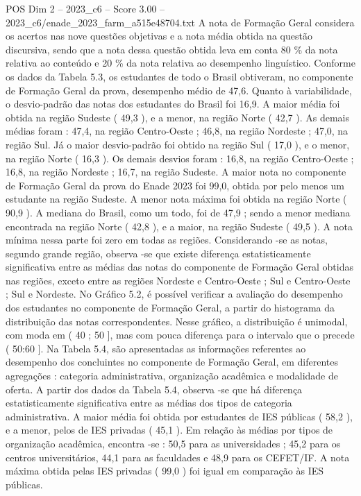 \begin{textsample}{POS Dim 2 – 2023\_c6 – Score 3.00 – 2023\_c6/enade\_2023\_farm\_a515e48704.txt}
A nota de Formação Geral considera os acertos nas nove questões objetivas e a nota média obtida na questão discursiva, sendo que a nota dessa questão obtida leva em conta 80 \% da nota relativa ao conteúdo e 20 \% da nota relativa ao desempenho linguístico.
Conforme os dados da Tabela 5.3, os estudantes de todo o Brasil obtiveram, no componente de Formação Geral da prova, desempenho médio de 47,6.
Quanto à variabilidade, o desvio-padrão das notas dos estudantes do Brasil foi 16,9.
A maior média foi obtida na região Sudeste ( 49,3 ), e a menor, na região Norte ( 42,7 ).
As demais médias foram : 47,4, na região Centro-Oeste ; 46,8, na região Nordeste ; 47,0, na região Sul.
Já o maior desvio-padrão foi obtido na região Sul ( 17,0 ), e o menor, na região Norte ( 16,3 ).
Os demais desvios foram : 16,8, na região Centro-Oeste ; 16,8, na região Nordeste ; 16,7, na região Sudeste.
A maior nota no componente de Formação Geral da prova do Enade 2023 foi 99,0, obtida por pelo menos um estudante na região Sudeste.
A menor nota máxima foi obtida na região Norte ( 90,9 ).
A mediana do Brasil, como um todo, foi de 47,9 ; sendo a menor mediana encontrada na região Norte ( 42,8 ), e a maior, na região Sudeste ( 49,5 ).
A nota mínima nessa parte foi zero em todas as regiões.
Considerando -se as notas, segundo grande região, observa -se que existe diferença estatisticamente significativa entre as médias das notas do componente de Formação Geral obtidas nas regiões, exceto entre as regiões Nordeste e Centro-Oeste ; Sul e Centro-Oeste ; Sul e Nordeste.
No Gráfico 5.2, é possível verificar a avaliação do desempenho dos estudantes no componente de Formação Geral, a partir do histograma da distribuição das notas correspondentes.
Nesse gráfico, a distribuição é unimodal, com moda em ( 40 ; 50 ], mas com pouca diferença para o intervalo que o precede ( 50:60 ].
Na Tabela 5.4, são apresentadas as informações referentes ao desempenho dos concluintes no componente de Formação Geral, em diferentes agregações : categoria administrativa, organização acadêmica e modalidade de oferta.
A partir dos dados da Tabela 5.4, observa -se que há diferença estatisticamente significativa entre as médias dos tipos de categoria administrativa.
A maior média foi obtida por estudantes de IES públicas ( 58,2 ), e a menor, pelos de IES privadas ( 45,1 ).
Em relação às médias por tipos de organização acadêmica, encontra -se : 50,5 para as universidades ; 45,2 para os centros universitários, 44,1 para as faculdades e 48,9 para os CEFET/IF.
A nota máxima obtida pelas IES privadas ( 99,0 ) foi igual em comparação às IES públicas.

\end{textsample}
